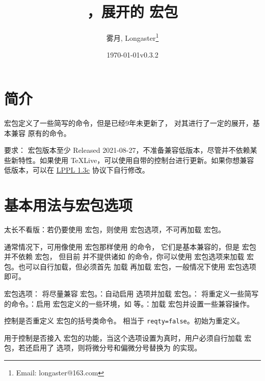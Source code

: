 \documentclass{ctxdoc}
\author{雾月, Longaster\thanks{Email: longaster@163.com}}
\title{\pkg{physicx}，展开的 \pkg{physics} 宏包}
\date{\today\quad v0.3.2}
\def\emph#1{\textcolor{red!80!black}{#1}}
\begin{document}
\maketitle

\tableofcontents


\section{简介}

 宏包定义了一些简写的命令，但是已经9年未更新了， 对其进行了一定的展开，基本兼容  原有的命令。

要求： 宏包版本至少 Released 2021-08-27，\emph{不准备兼容低版本}，尽管并不依赖某些新特性。如果使用 TeXLive，可以使用自带的控制台进行更新。如果你想兼容低版本，可以在 \href{http://www.latex-project.org/lppl.txt}{LPPL 1.3c} 协议下自行修改。

\section{基本用法与宏包选项}

\emph{太长不看版}：若仍要使用  宏包，则使用  宏包选项，\emph{不可}再加载  宏包。

通常情况下，可用像使用  宏包那样使用  的命令，
它们是基本兼容的，但是  宏包并不依赖  宏包，
但目前  并不提供诸如  的命令，你可以使用  
宏包选项来加载  宏包。也可以自行加载，但必须首先
加载  再加载  宏包，一般情况下使用  
宏包选项即可。

宏包选项： 将尽量兼容  宏包。：自动启用  选项并加载  宏包。： 将重定义一些简写的命令。：启用  宏包定义的一些环境，如  等。：加载  宏包并设置一些兼容操作。

 控制是否重定义  宏包的括号类命令。 相当于 \verb|reqty=false|。初始为重定义。

 用于控制是否接入  宏包的功能，当这个选项设置为真时，用户必须自行加载  宏包，若还启用了  选项，则将微分号和偏微分号替换为  的实现。
\end{document}

